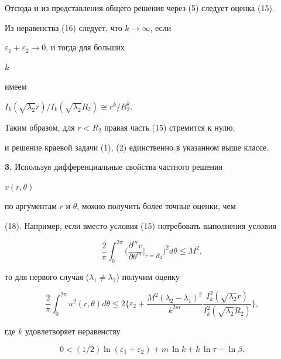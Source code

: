 \begin{pf}
Отсюда и из представления общего решения через (5) следует оценка (15). 


Из неравенства (16) следует, что $k\to\infty$, если 


$\varepsilon_1+\varepsilon_2\to 0$, и тогда для больших 


$k$ 


имеем


$I_k(\sqrt{\lambda_2}r)/I_k(\sqrt{\lambda_2}R_2)\cong r^k/R^k_2$. 


Таким образом, для $r<R_2$ правая часть (15) стремится к нулю, 


и решение краевой задачи (1), (2) единственно в указанном выше классе. 


\end{pf} 


 


{\bf 3.} Используя дифференциальные свойства частного решения 


$v(r,\theta)$ 


по аргументам $r$ и $\theta$, можно получить более точные оценки, чем 


(18). Например, если вместо условия (15) потребовать выполнения условия 


\begin{equation} 


\frac{2}{\pi}\int^{2\pi}_0\bigg( 


\frac{\partial^m v}{\partial\theta^m}\bigg|_{r=R_2} 


\bigg)^2d\theta\le M^2, 


\end{equation} 


то для первого случая ($\lambda_1\ne\lambda_2$) получим оценку 


\begin{equation} 


\frac{2}{\pi}\int^{2\pi}_0u^2(r,\theta)d\theta\le2\bigg\{ 


\varepsilon_2+\frac{M^2(\lambda_2-\lambda_1)^2}{k^{2m}} 


\frac{I^2_k(\sqrt{\lambda_2}r)}{I^2_k(\sqrt{\lambda_2}R_2)}\bigg\}, 


\end{equation} 


где $k$ удовлетворяет неравенству 


\begin{equation} 


0<(1/2)\ln(\varepsilon_1+\varepsilon_2)+m\,\ln k+k\,\ln\tau-\ln\beta. 


\end{equation} 


